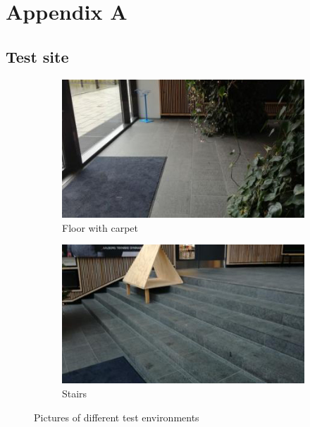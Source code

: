 \chapter{Appendix A}
\section{Test site}
\begin{figure}[h]
\centering
    \begin{subfigure}{.49\textwidth}
        \centering
        \includegraphics[width=\textwidth]{figures/testarea1.jpg}
        \caption{Floor with carpet}
        \label{fig:testsite1} 
    \end{subfigure}
    \begin{subfigure}{.49\textwidth}
        \centering
        \includegraphics[width=\textwidth]{figures/testarea2.jpg} 
        \caption{Stairs}
        \label{fig:testsite2}
    \end{subfigure}
\caption{Pictures of different test environments}
\label{fig:testsite12}
\end{figure}
